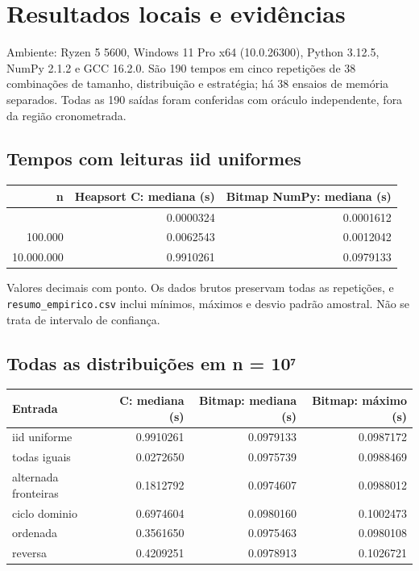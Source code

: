 \documentclass[
  brazilian,
  11pt,
  a4paper,
]{article}
\newcounter{none} %
\let\oldsection\section
\renewcommand{\section}{\Needspace{6\baselineskip}\oldsection}
\begin{document}
\section{Resultados locais e
evidências}\label{resultados-locais-e-eviduxeancias}

Ambiente: Ryzen 5 5600, Windows 11 Pro x64 (10.0.26300), Python 3.12.5,
NumPy 2.1.2 e GCC 16.2.0. São 190 tempos em cinco repetições de 38
combinações de tamanho, distribuição e estratégia; há 38 ensaios de
memória separados. Todas as 190 saídas foram conferidas com oráculo
independente, fora da região cronometrada.

\subsection{Tempos com leituras iid
uniformes}\label{tempos-com-leituras-iid-uniformes}

{\def\LTcaptype{none} %
\begin{longtable}[]{@{}rrr@{}}
\toprule\noalign{}
n & Heapsort C: mediana (s) & Bitmap NumPy: mediana (s) \\
\midrule\noalign{}
\endhead
\bottomrule\noalign{}
\endlastfoot
1.000 & 0.0000324 & 0.0001612 \\
100.000 & 0.0062543 & 0.0012042 \\
10.000.000 & 0.9910261 & 0.0979133 \\
\end{longtable}
}

Valores decimais com ponto. Os dados brutos preservam todas as
repetições, e \texttt{resumo\_\allowbreak{}empirico.\allowbreak{}csv}
inclui mínimos, máximos e desvio padrão amostral. Não se trata de
intervalo de confiança.

\subsection{Todas as distribuições em n =
10⁷}\label{todas-as-distribuiuxe7uxf5es-em-n-10ux2077}

{\def\LTcaptype{none} %
\begin{longtable}[]{@{}lrrr@{}}
\toprule\noalign{}
Entrada & C: mediana (s) & Bitmap: mediana (s) & Bitmap: máximo (s) \\
\midrule\noalign{}
\endhead
\bottomrule\noalign{}
\endlastfoot
iid uniforme & 0.9910261 & 0.0979133 & 0.0987172 \\
todas iguais & 0.0272650 & 0.0975739 & 0.0988469 \\
alternada fronteiras & 0.1812792 & 0.0974607 & 0.0988012 \\
ciclo dominio & 0.6974604 & 0.0980160 & 0.1002473 \\
ordenada & 0.3561650 & 0.0975463 & 0.0980108 \\
reversa & 0.4209251 & 0.0978913 & 0.1026721 \\
\end{longtable}
}
\end{document}
